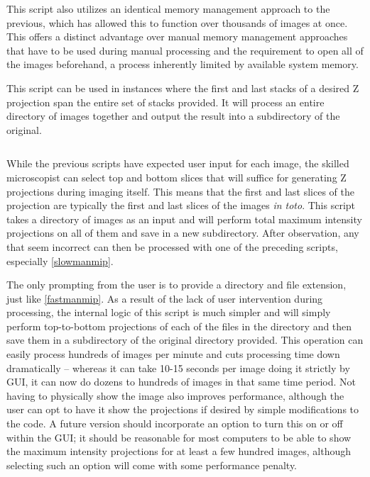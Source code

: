 This script also utilizes an identical memory management approach to the previous, which has allowed this to function over thousands of images at once. This offers a distinct advantage over manual memory management approaches that have to be used during manual processing and the requirement to open all of the images beforehand, a process inherently limited by available system memory.

\begin{code}
\caption{This script can be used in instances where the first and last stacks of a desired Z projection span the entire set of stacks provided. It will process an entire directory of images together and output the result into a subdirectory of the original.}
\label{bulkmip}

\inputminted[breaklines,frame=single,fontsize=\small]{python}{source/bulkMIPper.py}

\end{code}

While the previous scripts have expected user input for each image, the skilled microscopist can select top and bottom slices that will suffice for generating Z projections during imaging itself. This means that the first and last slices of the projection are typically the first and last slices of the images \textit{in toto}. This script takes a directory of images as an input and will perform total maximum intensity projections on all of them and save in a new subdirectory. After observation, any that seem incorrect can then be processed with one of the preceding scripts, especially \autoref{slowmanmip}. 

The only prompting from the user is to provide a directory and file extension, just like \autoref{fastmanmip}. As a result of the lack of user intervention during processing, the internal logic of this script is much simpler and will simply perform top\hyp{}to\hyp{}bottom projections of each of the files in the directory and then save them in a subdirectory of the original directory provided. This operation can easily process hundreds of images per minute and cuts processing time down dramatically -- whereas it can take 10\hyp{}15 seconds per image doing it strictly by GUI, it can now do dozens to hundreds of images in that same time period. Not having to physically show the image also improves performance, although the user can opt to have it show the projections if desired by simple modifications to the code. A future version should incorporate an option to turn this on or off within the GUI; it should be reasonable for most computers to be able to show the maximum intensity projections for at least a few hundred images, although selecting such an option will come with some performance penalty.


